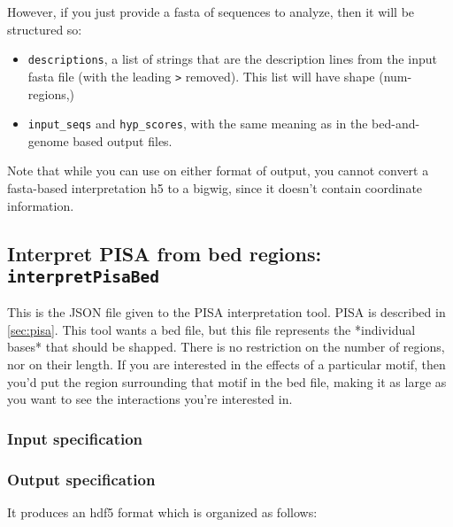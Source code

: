 \documentclass{article}
\begin{document}
However, if you just provide a fasta of sequences to analyze, then it will be
structured so:

\begin{itemize}
    \item \texttt{descriptions}, a list of strings that are the description
        lines from the input fasta file (with the leading \texttt{>} removed).
        This list will have shape (num-regions,)
    \item \texttt{input\_seqs} and \texttt{hyp\_scores}, with the same meaning
        as in the bed-and-genome based output files.
\end{itemize}

Note that while you can use  on either format of
 output, you cannot convert a fasta-based interpretation
h5 to a bigwig, since it doesn't contain coordinate information.


\newpage
\subsection{Interpret PISA from bed regions: \texttt{interpretPisaBed}}\label{prog:interpretPisaBed}

This is the JSON file given to the PISA interpretation tool. PISA is described
in \ref{sec:pisa}.
This tool wants a bed file, but this file represents the *individual bases* that
should be shapped.
There is no restriction on the number of regions, nor on their length.
If you are interested in the effects of a particular motif, then you'd put the
region surrounding that motif in the bed file, making it as large as you want
to see the interactions you're interested in.

\subsubsection{Input specification}



\subsubsection{Output specification}

It produces an hdf5 format which is organized as follows:
\end{document}
